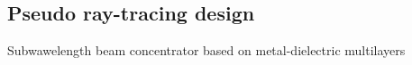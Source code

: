 \documentclass{beamer}
\begin{document}
\begin{frame}[t]
\begin{columns}
\begin{column}{0.5\textwidth}
		\end{column}
	\end{columns}
	{\tiny \cite{prism2010}}
		
\end{frame}

\subsection{Pseudo ray-tracing design}

\begin{frame}
Subwawelength beam concentrator based on metal-dielectric multilayers
	\begin{columns}
		\begin{column}{0.5\textwidth}
			\begin{figure}[htb]

\end{figure}
\end{column}
\end{columns}
\end{frame}
\end{document}
